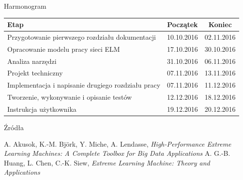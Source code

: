 \documentclass{beamer}
\begin{document}
\begin{frame}{Harmonogram}
\begin{table}[H]
\begin{tabular}{| L{6cm} |c|c|}
\hline
\textbf{Etap} & \textbf{Początek} & \textbf{Koniec} \\

\hline
Przygotowanie pierwszego rozdziału dokumentacji & 10.10.2016 & 02.11.2016 \\
\hline
Opracowanie modelu pracy sieci ELM & 17.10.2016 & 30.10.2016 \\
\hline
Analiza narzędzi &  31.10.2016 & 06.11.2016 \\
\hline
Projekt techniczny &  07.11.2016 & 13.11.2016 \\
\hline
Implementacja i napisanie drugiego rozdziału pracy & 07.11.2016 & 11.12.2016 \\
\hline
Tworzenie, wykonywanie i opisanie testów & 12.12.2016 & 18.12.2016 \\
\hline
Instrukcja użytkownika & 19.12.2016 & 20.12.2016 \\
\hline
\end{tabular}
\end{table}
\end{frame}
\begin{frame}{Źródła}
\begin{thebibliography}{9}
  A. Akusok, K.-M. Björk, Y. Miche, A. Lendasse,
  \emph{High-Performance Extreme Learning Machines: A Complete Toolbox for Big Data Applications}
  A. G.-B. Huang, L. Chen, C.-K. Siew, 
  \emph{Extreme Learning Machine: Theory and Applications}
\end{thebibliography}
\end{frame}
\end{document}
